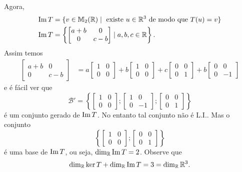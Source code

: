 \begin{exemplos}
\begin{enumerate}
\begin{solucao}
			Agora,
			\begin{align*}
				{\rm Im\,} T &= \{v \in \mathbb{M}_2(\mathbb{R}) \mid \mbox{ existe } u \in \mathbb{R}^3 \mbox{ de modo que } T(u) = v\}\\
				{\rm Im\,} T &= \left\{ \begin{bmatrix}
					a + b & 0\\
					0 & c - b
				\end{bmatrix} \mid a, b, c \in \mathbb{R}\right\}.
			\end{align*}
			Assim temos
			\begin{align*}
				\begin{bmatrix}
					a + b & 0\\
					0 & c - b
				\end{bmatrix} &= a \begin{bmatrix}
					1 & 0\\ 0 & 0
				\end{bmatrix} + b \begin{bmatrix}
					1 & 0\\ 0 & 0
				\end{bmatrix} + c \begin{bmatrix}
					0 & 0\\ 0 & 1
				\end{bmatrix} + b \begin{bmatrix}
					0 & 0\\ 0 & -1
				\end{bmatrix}
			\end{align*}
			e \'e f\'acil ver que
			\[
				\mathcal{B}' = \left\{ \begin{bmatrix}
					1 & 0\\ 0 & 0
				\end{bmatrix}; \begin{bmatrix}
					1 & 0\\ 0 & -1
				\end{bmatrix}; \begin{bmatrix}
					0 & 0\\ 0 & 1
				\end{bmatrix}\right\}
			\]
			\'e um conjunto gerado de ${\rm Im\,} T$. No entanto tal conjunto n\~ao \'e L.I.. Mas o conjunto
			\[
				\left\{ \begin{bmatrix}
					1 & 0\\ 0 & 0
				\end{bmatrix}; \begin{bmatrix}
					0 & 0\\ 0 & 1
				\end{bmatrix}\right\}
			\]
			\'e uma base de ${\rm Im\,} T$, ou seja, $\dim_{\mathbb{R}}{\rm Im\,} T = 2$. Observe que
			\[
				\dim_{\mathbb{R}}\ker T + \dim_{\mathbb{R}}{\rm Im\,} T = 3 = \dim_{\mathbb{R}}\mathbb{R}^3.
			\]
		\end{solucao}


\end{enumerate}
\end{exemplos}
